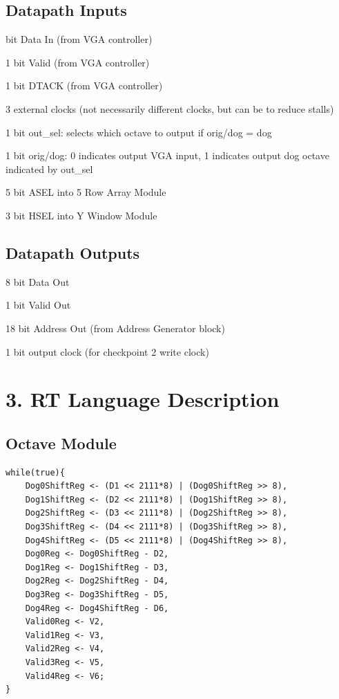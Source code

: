 \documentclass[11pt]{article}
\begin{document}
\subsection*{Datapath Inputs}

 bit Data In (from VGA controller)

1 bit Valid  (from VGA controller)

1 bit DTACK (from VGA controller)

3 external clocks (not necessarily different clocks, but can be to reduce stalls)

1 bit out\_sel: selects which octave to output if orig/dog = dog

1 bit orig/dog: 0 indicates output VGA input, 1 indicates output dog octave indicated by out\_sel

5 bit ASEL into 5 Row Array Module

3 bit HSEL into Y Window Module

\subsection*{Datapath Outputs}

8 bit Data Out

1 bit Valid Out

18 bit Address Out (from Address Generator block)

1 bit output clock (for checkpoint 2 write clock)

\section*{3. RT Language Description}

\subsection*{Octave Module}
\begin{lstlisting}
while(true){
    Dog0ShiftReg <- (D1 << 2111*8) | (Dog0ShiftReg >> 8),
    Dog1ShiftReg <- (D2 << 2111*8) | (Dog1ShiftReg >> 8),
    Dog2ShiftReg <- (D3 << 2111*8) | (Dog2ShiftReg >> 8),
    Dog3ShiftReg <- (D4 << 2111*8) | (Dog3ShiftReg >> 8),
    Dog4ShiftReg <- (D5 << 2111*8) | (Dog4ShiftReg >> 8),
    Dog0Reg <- Dog0ShiftReg - D2,
    Dog1Reg <- Dog1ShiftReg - D3,
    Dog2Reg <- Dog2ShiftReg - D4,
    Dog3Reg <- Dog3ShiftReg - D5,
    Dog4Reg <- Dog4ShiftReg - D6,
    Valid0Reg <- V2,
    Valid1Reg <- V3,
    Valid2Reg <- V4,
    Valid3Reg <- V5,
    Valid4Reg <- V6;
}
\end{lstlisting}
\end{document}
